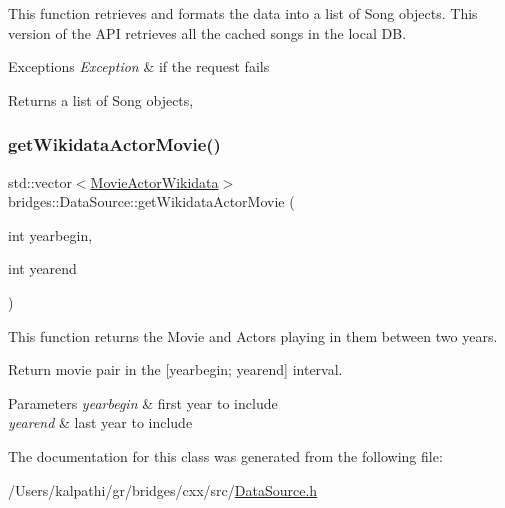 This function retrieves and formats the data into a list of Song objects. This version of the A\+PI retrieves all the cached songs in the local DB.


\begin{DoxyExceptions}{Exceptions}
{\em Exception} & if the request fails\\
\hline
\end{DoxyExceptions}
\begin{DoxyReturn}{Returns}
a list of Song objects, 
\end{DoxyReturn}
\mbox{\label{classbridges_1_1_data_source_a25b33736b4ae9ffea5fe4ebf5dbb3a63}} 
\subsubsection{\texorpdfstring{getWikidataActorMovie()}{getWikidataActorMovie()}}
{\footnotesize\ttfamily std\+::vector$<$\mbox{\hyperlink{classbridges_1_1dataset_1_1_movie_actor_wikidata}{Movie\+Actor\+Wikidata}}$>$ bridges\+::\+Data\+Source\+::get\+Wikidata\+Actor\+Movie (\begin{DoxyParamCaption}\item[{int}]{yearbegin,  }\item[{int}]{yearend }\end{DoxyParamCaption})\hspace{0.3cm}{\ttfamily [inline]}}



This function returns the Movie and Actors playing in them between two years. 

Return movie pair in the \mbox{[}yearbegin; yearend\mbox{]} interval.


\begin{DoxyParams}{Parameters}
{\em yearbegin} & first year to include \\
\hline
{\em yearend} & last year to include \\
\hline
\end{DoxyParams}


The documentation for this class was generated from the following file\+:\begin{DoxyCompactItemize}
\item 
/\+Users/kalpathi/gr/bridges/cxx/src/\mbox{\hyperlink{_data_source_8h}{Data\+Source.\+h}}\end{DoxyCompactItemize}
